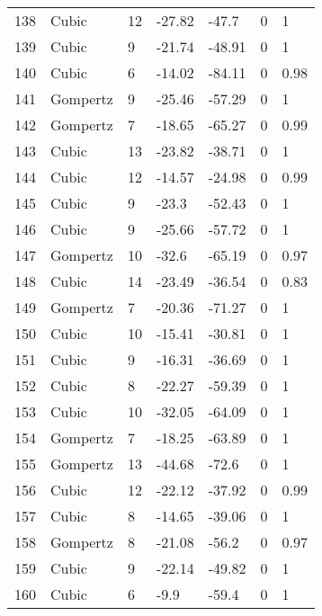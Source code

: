 \documentclass[11pt]{article}
\begin{document}
\begin{center}
\begin{longtable}{lllllll}
    138 & Cubic     & 12              & -27.82  & -47.7   & 0       & 1    \\
    139 & Cubic     & 9               & -21.74  & -48.91  & 0       & 1    \\
    140 & Cubic     & 6               & -14.02  & -84.11  & 0       & 0.98 \\
    141 & Gompertz  & 9               & -25.46  & -57.29  & 0       & 1    \\
    142 & Gompertz  & 7               & -18.65  & -65.27  & 0       & 0.99 \\
    143 & Cubic     & 13              & -23.82  & -38.71  & 0       & 1    \\
    144 & Cubic     & 12              & -14.57  & -24.98  & 0       & 0.99 \\
    145 & Cubic     & 9               & -23.3   & -52.43  & 0       & 1    \\
    146 & Cubic     & 9               & -25.66  & -57.72  & 0       & 1    \\
    147 & Gompertz  & 10              & -32.6   & -65.19  & 0       & 0.97 \\
    148 & Cubic     & 14              & -23.49  & -36.54  & 0       & 0.83 \\
    149 & Gompertz  & 7               & -20.36  & -71.27  & 0       & 1    \\
    150 & Cubic     & 10              & -15.41  & -30.81  & 0       & 1    \\
    151 & Cubic     & 9               & -16.31  & -36.69  & 0       & 1    \\
    152 & Cubic     & 8               & -22.27  & -59.39  & 0       & 1    \\
    153 & Cubic     & 10              & -32.05  & -64.09  & 0       & 1    \\
    154 & Gompertz  & 7               & -18.25  & -63.89  & 0       & 1    \\
    155 & Gompertz  & 13              & -44.68  & -72.6   & 0       & 1    \\
    156 & Cubic     & 12              & -22.12  & -37.92  & 0       & 0.99 \\
    157 & Cubic     & 8               & -14.65  & -39.06  & 0       & 1    \\
    158 & Gompertz  & 8               & -21.08  & -56.2   & 0       & 0.97 \\
    159 & Cubic     & 9               & -22.14  & -49.82  & 0       & 1    \\
    160 & Cubic     & 6               & -9.9    & -59.4   & 0       & 1    \\

\end{longtable}
\end{center}
\end{document}
